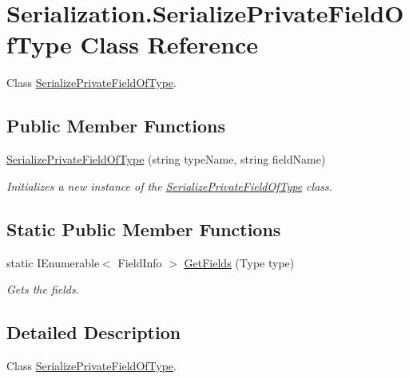 \hypertarget{class_serialization_1_1_serialize_private_field_of_type}{}\section{Serialization.\+Serialize\+Private\+Field\+Of\+Type Class Reference}
\label{class_serialization_1_1_serialize_private_field_of_type}


Class \hyperlink{class_serialization_1_1_serialize_private_field_of_type}{Serialize\+Private\+Field\+Of\+Type}.  


\subsection*{Public Member Functions}
\begin{DoxyCompactItemize}
\item 
\hyperlink{class_serialization_1_1_serialize_private_field_of_type_aec3524519e8f181567a7891eed967ae5}{Serialize\+Private\+Field\+Of\+Type} (string type\+Name, string field\+Name)
\begin{DoxyCompactList}\small\item\em Initializes a new instance of the \hyperlink{class_serialization_1_1_serialize_private_field_of_type}{Serialize\+Private\+Field\+Of\+Type} class. \end{DoxyCompactList}\end{DoxyCompactItemize}
\subsection*{Static Public Member Functions}
\begin{DoxyCompactItemize}
\item 
static I\+Enumerable$<$ Field\+Info $>$ \hyperlink{class_serialization_1_1_serialize_private_field_of_type_a1354bf6675fc61e5fc953edc95a61d96}{Get\+Fields} (Type type)
\begin{DoxyCompactList}\small\item\em Gets the fields. \end{DoxyCompactList}\end{DoxyCompactItemize}


\subsection{Detailed Description}
Class \hyperlink{class_serialization_1_1_serialize_private_field_of_type}{Serialize\+Private\+Field\+Of\+Type}. 



